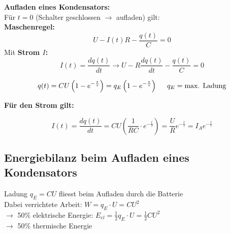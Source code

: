 \textbf{Aufladen eines Kondensators:} \\
Für $t = 0$ (Schalter geschlossen $\rightarrow$ aufladen) gilt:
\\[1ex]
\hspace{5mm} \textbf{Maschenregel:}
\[
    U - I(t) R - \frac{q(t)}{C} = 0
\]
\hspace{5mm} Mit \textbf{Strom $I$:}
\[
    I(t) = \frac{dq(t)}{dt} \rightarrow U - R\frac{dq(t)}{dt} - \frac{q(t)}{C} = 0
\]
\begin{formulabox}
    \[
    q(t) = CU\left( 1 - e^{-\frac{t}{\tau}} \right) = q_E\left( 1 - e^{-\frac{t}{\tau}} \right) \hspace{5mm} q_E = \text{max. Ladung}
    \]
\end{formulabox}
\hspace{5mm} \textbf{Für den Strom gilt:}
\begin{formulabox}
    \[
        I(t) = \frac{dq(t)}{dt} = CU \left( \frac{1}{RC} \cdot e^{-\frac{t}{\tau}} \right) = \frac{U}{R}e^{-\frac{t}{\tau}} = I_Ae^{-\frac{t}{\tau}}
    \]
\end{formulabox}
\vspace{2ex}

\subsection{Energiebilanz beim Aufladen eines Kondensators}
Ladung $q_E = CU$ fliesst beim Aufladen durch die Batterie \\[1ex]
Dabei verrichtete Arbeit: $W = q_E \cdot U = CU^2$ \\[1ex]
\hspace{5mm} $\rightarrow$ 50\% elektrische Energie: $E_{el} = \frac{1}{2} q_E \cdot U = \frac{1}{2} CU^2$ \\[1ex]
\hspace{5mm} $\rightarrow$ 50\% thermische Energie
\\[1ex]